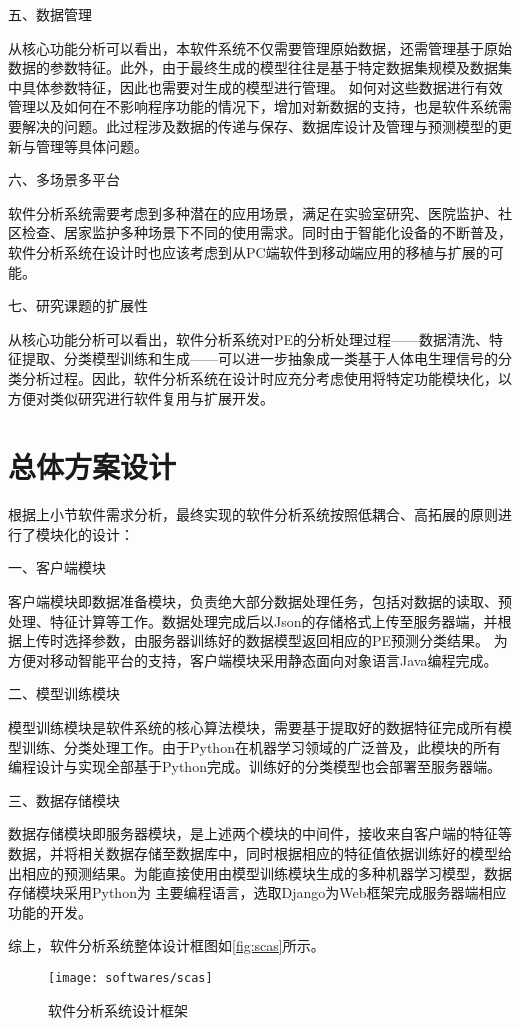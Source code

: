 五、数据管理

从核心功能分析可以看出，本软件系统不仅需要管理原始数据，还需管理基于原始数据的参数特征。此外，由于最终生成的模型往往是基于特定数据集规模及数据集中具体参数特征，因此也需要对生成的模型进行管理。
如何对这些数据进行有效管理以及如何在不影响程序功能的情况下，增加对新数据的支持，也是软件系统需要解决的问题。此过程涉及数据的传递与保存、数据库设计及管理与预测模型的更新与管理等具体问题。

六、多场景多平台

软件分析系统需要考虑到多种潜在的应用场景，满足在实验室研究、医院监护、社区检查、居家监护多种场景下不同的使用需求。同时由于智能化设备的不断普及，软件分析系统在设计时也应该考虑到从PC端软件到移动端应用的移植与扩展的可能。

七、研究课题的扩展性

从核心功能分析可以看出，软件分析系统对PE的分析处理过程——数据清洗、特征提取、分类模型训练和生成——可以进一步抽象成一类基于人体电生理信号的分类分析过程。因此，软件分析系统在设计时应充分考虑使用将特定功能模块化，以方便对类似研究进行软件复用与扩展开发。

\section{总体方案设计}
根据上小节软件需求分析，最终实现的软件分析系统按照低耦合、高拓展的原则进行了模块化的设计：

一、客户端模块

客户端模块即数据准备模块，负责绝大部分数据处理任务，包括对数据的读取、预处理、特征计算等工作。数据处理完成后以Json的存储格式上传至服务器端，并根据上传时选择参数，由服务器训练好的数据模型返回相应的PE预测分类结果。
为方便对移动智能平台的支持，客户端模块采用静态面向对象语言Java编程完成。

二、模型训练模块

模型训练模块是软件系统的核心算法模块，需要基于提取好的数据特征完成所有模型训练、分类处理工作。由于Python在机器学习领域的广泛普及，此模块的所有编程设计与实现全部基于Python完成。训练好的分类模型也会部署至服务器端。

三、数据存储模块

数据存储模块即服务器模块，是上述两个模块的中间件，接收来自客户端的特征等数据，并将相关数据存储至数据库中，同时根据相应的特征值依据训练好的模型给出相应的预测结果。为能直接使用由模型训练模块生成的多种机器学习模型，数据存储模块采用Python为
主要编程语言，选取Django为Web框架完成服务器端相应功能的开发。

综上，软件分析系统整体设计框图如\autoref{fig:scas}所示。
\begin{figure}[htbp]
    \centering
    \texttt{[image: softwares/scas]}
    \caption{\label{fig:scas}软件分析系统设计框架}
\end{figure}

